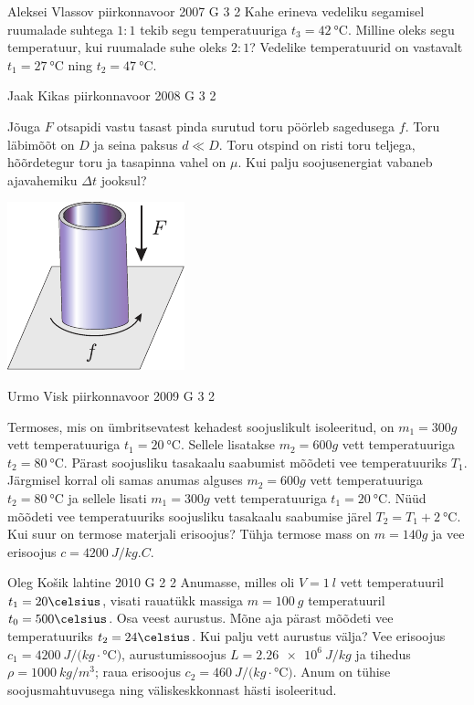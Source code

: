 \documentclass[11pt]{article}
\begin{document}
{%
{Aleksei Vlassov} %
{piirkonnavoor} %
{2007} %
{G 3} %
{2} %
{
\ifStatement
Kahe erineva vedeliku segamisel ruumalade suhtega $1 : 1$ tekib segu temperatuuriga $t_3 = \SI{42}{\celsius}$. Milline oleks segu temperatuur, kui ruumalade suhe oleks $2 : 1$? Vedelike temperatuurid on vastavalt $t_1 = \SI{27}{\celsius}$ ning $t_2 = \SI{47}{\celsius}$.
\fi
}

{Jaak Kikas} %
{piirkonnavoor} %
{2008} %
{G 3} %
{2} %
{
\ifStatement
Jõuga $F$ otsapidi vastu tasast pinda surutud toru pöörleb sagedusega $f$. Toru läbimõõt on $D$ ja seina paksus $d \ll D$. Toru otspind on risti toru teljega, hõõrdetegur toru ja tasapinna vahel on $\mu$. Kui palju soojusenergiat vabaneb ajavahemiku $\Delta t$ jooksul?

\begin{center}
	\includegraphics[width=0.3\linewidth]{2008-v2g-03-yl}
\end{center}
\fi
}

{Urmo Visk} %
{piirkonnavoor} %
{2009} %
{G 3} %
{2} %
{
\ifStatement
Termoses, mis on ümbritsevatest kehadest soojuslikult isoleeritud, on $m_1 = \SI{300}g$ vett temperatuuriga $t_1 = \SI{20}{\celsius}$. Sellele lisatakse $m_2 = \SI{600}g$ vett temperatuuriga $t_2 = \SI{80}{\celsius}$. Pärast soojusliku
tasakaalu saabumist mõõdeti vee temperatuuriks $T_1$. Järgmisel korral oli
samas anumas alguses $m_2 = \SI{600}g$ vett temperatuuriga $t_2 = \SI{80}{\celsius}$ ja sellele lisati $m_1 = \SI{300}g$ vett temperatuuriga $t_1 = \SI{20}{\celsius}$. Nüüd mõõdeti vee temperatuuriks soojusliku tasakaalu saabumise järel $T_2 = T_1+\SI{2}{\celsius}$. Kui
suur on termose materjali erisoojus? Tühja termose mass on $m = \SI{140}g$ ja vee erisoojus $c = \SI{4200}{J/kg.C}$.

\fi
}

{Oleg Košik} %
{lahtine} %
{2010} %
{G 2} %
{2} %
{
\ifStatement
Anumasse, milles oli $V=\SI{1}{l}$ vett temperatuuril $t_1=20\celsius$,
visati rauatükk massiga $m=\SI{100}{g}$ temperatuuril $t_0=500\celsius$. Osa
veest aurustus. Mõne aja pärast mõõdeti vee temperatuuriks
$t_2=24\celsius$. Kui palju vett aurustus välja? Vee erisoojus
$c_1=\SI{4200}{J/(kg\cdot\celsius)}$, aurustumissoojus $L=\SI{2,26 e6}{J/kg}$ ja
tihedus $\rho=\SI{1000}{kg/m^3}$; raua
erisoojus $c_2=\SI{460}{J/(kg\cdot\celsius)}$. Anum on tühise soojusmahtuvusega ning väliskeskkonnast
hästi isoleeritud.
\fi
}

}
\end{document}
